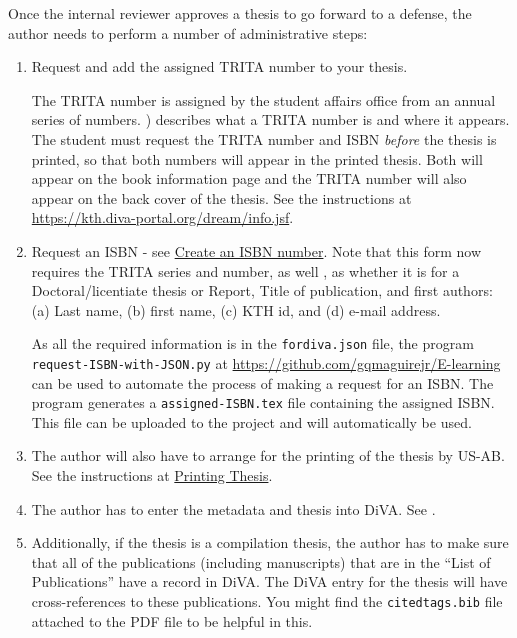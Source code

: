 \documentclass[12pt, twoside]{article}
\newcommand{\fname}[1]{\texttt{#1}}
\begin{document}
Once the internal reviewer approves a thesis to go forward to a defense, the author needs to perform a number of administrative steps:
\begin{enumerate}
    \item Request and add the assigned TRITA number to your thesis.
    
    The TRITA number is assigned by the student affairs office from an annual series of numbers. ) describes what a TRITA number is and where it appears. The student must request the TRITA number and \gls{ISBN} \textit{before} the thesis is printed, so that both numbers will appear in the printed thesis. Both will appear on the book information page and the TRITA number will also appear on the back cover of the thesis. See the instructions at \url{https://kth.diva-portal.org/dream/info.jsf}.

    \item Request an \gls{ISBN} - see \href{https://www.kth.se/en/biblioteket/publicera-analysera/vagledning-for-publicering/bestall-isbn-1.854778}{Create an ISBN number}. 
    Note that this form now requires the TRITA series and number, as well \first, as whether it is for a Doctoral/licentiate thesis or Report, \Second Title of publication, and \third first authors: (a) Last name, (b) first name, (c) KTH id, and (d) e-mail address.
    
    As all the required information is in the \fname{fordiva.json} file, the program \texttt{request-ISBN-with-JSON.py} at \url{https://github.com/gqmaguirejr/E-learning} can be used to automate the process of making a request for an ISBN. The program generates a \fname{assigned-ISBN.tex} file containing the assigned ISBN. This file can be uploaded to the project and will automatically be used.
    
    \item The author will also have to arrange for the printing of the thesis by US-AB. See the instructions at \href{https://www.kth.se/en/student/studier/examensarbete/avhandlingarochexamensarbeten/trycka-avhandlingar-1.900190}{Printing Thesis}.
    
    \item The author has to enter the metadata and thesis into \gls{DiVA}. See .
    
    \item Additionally, if the thesis is a compilation thesis, the author has to make sure that all of the publications (including manuscripts) that are in the \enquote{List of Publications} have a record in \gls{DiVA}. The \gls{DiVA} entry for the thesis will have cross-references to these publications. You might find the \fname{citedtags.bib} file attached to the \gls{PDF} file to be helpful in this.


\end{enumerate}
\end{document}
